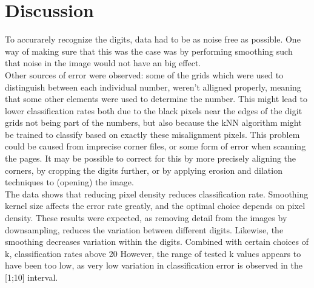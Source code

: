 \chapter{Discussion}
To accurarely recognize the digits, data had to be as noise free as possible.
One way of making sure that this was the case was by performing smoothing such
that noise in the image would not have an big effect.\\

Other sources of error were observed:
some of the grids which were used to distinguish between each individual number,
weren't alligned properly, meaning that some other elements were used to determine the number.
This might lead to lower classification rates both due to the black pixels near the edges
of the digit grids not being part of the numbers, but also because the kNN algorithm
might be trained to classify based on exactly these misalignment pixels.
This problem could be caused from imprecise corner files, or some form of error when scanning the pages.
It may be possible to correct for this by more precisely aligning the corners,
by cropping the digits further, 
or by applying erosion and dilation techniques to (opening) the image.\\

The data shows that reducing pixel density reduces classification rate.
Smoothing kernel size affects the error rate greatly, and the optimal choice depends on pixel density.
These results were expected, as removing detail from the images by downsampling,
reduces the variation between different digits. Likewise, the smoothing decreases
variation within the digits. Combined with certain choices of k, classification rates
above 20 %
However, the range of tested k values appears to have been too low,
as very low variation in classification error is observed in the [1;10] interval.